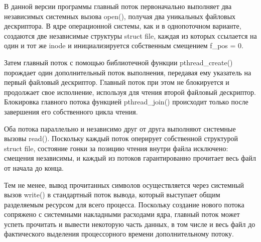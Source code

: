 


В данной версии программы главный поток первоначально выполняет два независимых 
системных вызова open(), получая два уникальных файловых дескриптора. В ядре 
операционной системы, как и в однопоточном варианте, создаются две независимые 
структуры struct file, каждая из которых ссылается на один и тот же inode и 
инициализируется собственным смещением f\_pos = 0.

Затем главный поток с помощью библиотечной функции pthread\_create() порождает 
один дополнительный поток выполнения, передавая ему указатель на первый 
файловый дескриптор. Главный поток при этом не блокируется и продолжает свое 
исполнение, используя для чтения второй файловый дескриптор. Блокировка главного 
потока функцией pthread\_join() происходит только после завершения его собственного 
цикла чтения.

Оба потока параллельно и независимо друг от друга выполняют системные вызовы 
read(). Поскольку каждый поток оперирует собственной структурой struct file, 
состояние гонки за позицию чтения внутри файла исключено: смещения 
независимы, и каждый из потоков гарантированно прочитает весь файл 
от начала до конца.

Тем не менее, вывод прочитанных символов осуществляется через системный вызов 
write() в стандартный поток вывода, который выступает общим разделяемым ресурсом 
для всего процесса. Поскольку создание нового потока сопряжено с системными 
накладными расходами ядра, главный поток может успеть прочитать и вывести 
некоторую часть данных, в том числе и весь файл до фактического выделения процессорного времени 
дополнительному потоку. 

